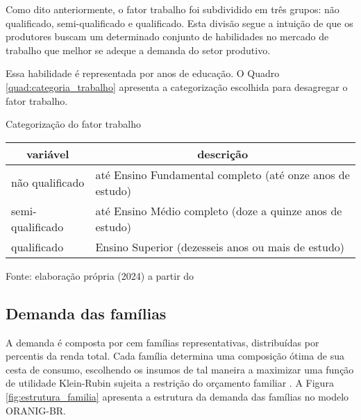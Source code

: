 Como dito anteriormente, o fator trabalho foi subdividido em três grupos: não qualificado, semi-qualificado e qualificado. Esta divisão segue a intuição de que os produtores buscam um determinado conjunto de habilidades no mercado de trabalho que melhor se adeque a demanda do setor produtivo.

Essa habilidade é representada por anos de educação. O Quadro \ref{quad:categoria_trabalho} apresenta a categorização escolhida para desagregar o fator trabalho.

\begin{quadro}[h]
	\centering
	\begin{threeparttable}
		\caption{Categorização do fator trabalho} \label{quad:categoria_trabalho}
		\footnotesize
		\begin{tabular}{|| m{3cm} | m{9cm} ||}
			\hline \hline
			\multicolumn{1}{||c|}{\textbf{variável}} & \multicolumn{1}{c||}{\textbf{descrição}} \\ \hline
			não qualificado  & até Ensino Fundamental completo (até onze anos de estudo) \\ \hline 
			semi-qualificado & até Ensino Médio completo (doze a quinze anos de estudo) \\ \hline
			qualificado      & Ensino Superior (dezesseis anos ou mais de estudo) \\ \hline \hline
		\end{tabular}
		\begin{tablenotes}
			\scriptsize
			\item Fonte: elaboração própria (2024) a partir do \textcite{inep04}
		\end{tablenotes}
	\end{threeparttable}
\end{quadro}

\subsection{Demanda das famílias} \label{subsec:demanda_familias}



A demanda é composta por cem famílias representativas, distribuídas por percentis da renda total. Cada família determina uma composição ótima de sua cesta de consumo, escolhendo os insumos de tal maneira a maximizar uma função de utilidade Klein-Rubin sujeita a restrição do orçamento familiar \cite{horridge03}. A Figura \ref{fig:estrutura_familia} apresenta a estrutura da demanda das famílias no modelo ORANIG-BR.

